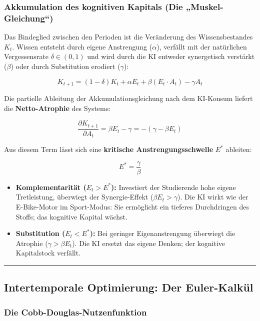 \documentclass[
  ngerman,
  letterpaper,
  DIV=11]{scrartcl}
\providecommand{\tightlist}{%
  \setlength{\itemsep}{0pt}\setlength{\parskip}{0pt}}
\begin{document}
\subsubsection{Akkumulation des kognitiven Kapitals (Die
„Muskel-Gleichung``)}\label{akkumulation-des-kognitiven-kapitals-die-muskel-gleichung}

Das Bindeglied zwischen den Perioden ist die Veränderung des
Wissensbestandes \(K_t\). Wissen entsteht durch eigene Anstrengung
(\(\alpha\)), verfällt mit der natürlichen Vergessensrate
\(\delta \in (0, 1)\) und wird durch die KI entweder synergetisch
verstärkt (\(\beta\)) oder durch Substitution erodiert (\(\gamma\)):

\[K_{t+1} = (1 - \delta) K_t + \alpha E_t + \beta (E_t \cdot A_t) - \gamma A_t\]

Die partielle Ableitung der Akkumulationsgleichung nach dem KI-Konsum
liefert die \textbf{Netto-Atrophie} des Systems:

\[\frac{\partial K_{t+1}}{\partial A_t} = \beta E_t - \gamma = -(\gamma - \beta E_t)\]

Aus diesem Term lässt sich eine \textbf{kritische Anstrengungsschwelle}
\(E^*\) ableiten:

\[E^* = \frac{\gamma}{\beta}\]

\begin{itemize}
\tightlist
\item
  \textbf{Komplementarität (\(E_t > E^*\)):} Investiert der Studierende
  hohe eigene Tretleistung, überwiegt der Synergie-Effekt
  (\(\beta E_t > \gamma\)). Die KI wirkt wie der E-Bike-Motor im
  Sport-Modus: Sie ermöglicht ein tieferes Durchdringen des Stoffs; das
  kognitive Kapital wächst.
\item
  \textbf{Substitution (\(E_t < E^*\)):} Bei geringer Eigenanstrengung
  überwiegt die Atrophie (\(\gamma > \beta E_t\)). Die KI ersetzt das
  eigene Denken; der kognitive Kapitalstock verfällt.
\end{itemize}

\begin{center}\rule{0.5\linewidth}{0.5pt}\end{center}

\subsection{Intertemporale Optimierung: Der
Euler-Kalkül}\label{intertemporale-optimierung-der-euler-kalkuxfcl}

\subsubsection{Die
Cobb-Douglas-Nutzenfunktion}\label{die-cobb-douglas-nutzenfunktion}
\end{document}
